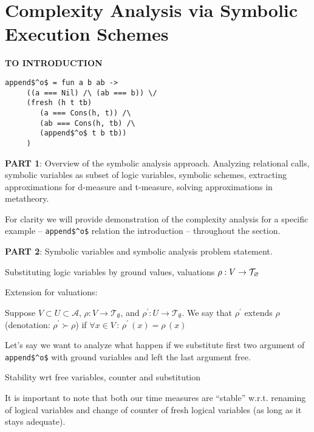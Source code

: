 \section{Complexity Analysis via Symbolic Execution Schemes}
\label{sec:symbolic}

\colorbox{yellow!20}{\textbf{TO INTRODUCTION}}
\begin{lstlisting}[basicstyle=\small]
   append$^o$ = fun a b ab ->
     ((a === Nil) /\ (ab === b)) \/
     (fresh (h t tb)
        (a === Cons(h, t)) /\
        (ab === Cons(h, tb) /\
        (append$^o$ t b tb)) 
     )
\end{lstlisting}

\colorbox{blue!20}{\parbox{\textwidth}{\textbf{PART 1}: Overview of the symbolic analysis approach.
Analyzing relational calls, symbolic variables as subset of logic variables, symbolic schemes, extracting approximations for d-measure and t-measure, solving approximations in metatheory.}}

For clarity we will provide demonstration of the complexity analysis for a specific example -- \lstinline|append$^o$| relation the introduction  -- throughout the section.

\colorbox{blue!20}{\parbox{\textwidth}{\textbf{PART 2}: Symbolic variables and symbolic analysis problem statement.}}

\colorbox{blue!20}{\parbox{\textwidth}{Substituting logic variables by ground values, valuations $\rho : V \to \mathcal{T}_{\varnothing}$}}

Extension for valuations:

\begin{definition}
  Suppose $V \subset U \subset \mathcal{A}$, $\rho \colon V \to \mathcal{T}_{\emptyset}$, and $\rho^\prime \colon U \to \mathcal{T}_{\emptyset}$. We say that $\rho^\prime$ extends $\rho$ (denotation: $ \rho^\prime \succ \rho$) if $ \forall x \in V \,:\, \rho^\prime\,(x) = \rho\,(x) $
\end{definition}

Let's say we want to analyze what happen if we substitute first two argument of \lstinline|append$^o$| with ground variables and left the last argument free.

\colorbox{blue!20}{\parbox{\textwidth}{Stability wrt free variables, counter and substitution}}

It is important to note that both our time measures are ``stable'' w.r.t. renaming of logical variables and change of counter of fresh logical variables (as long as it stays adequate).

